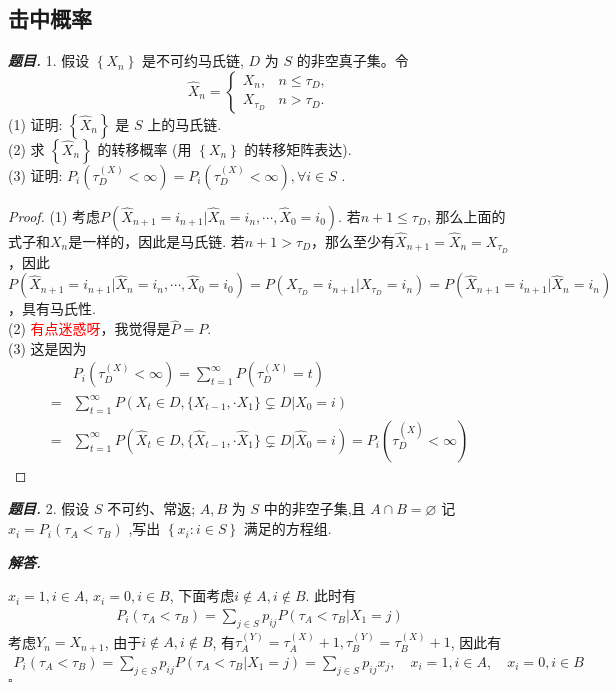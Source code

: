 \documentclass[10pt, a4paper, oneside]{ctexart}
\newenvironment{problem}{\begin{framed}\par\noindent\textbf{\textit{题目. }}}{\end{framed}\par}
\newenvironment{solution}{%
  \par\noindent\textbf{\textit{解答. }}\ignorespaces
}{%
  \hfill\ensuremath{\square}\par %
}
\begin{document}
\subsection{击中概率}
\begin{problem}
    1. 假设 $\left\{X_n\right\}$ 是不可约马氏链, $D$ 为 $S$ 的非空真子集。令
    $$
    \hat{X}_n= \begin{cases}X_n, & n \leqslant \tau_D, \\ X_{\tau_D} & n>\tau_D .\end{cases}
    $$
    (1) 证明: $\left\{\hat{X}_n\right\}$ 是 $S$ 上的马氏链.\\
    (2) 求 $\left\{\hat{X}_n\right\}$ 的转移概率 (用 $\left\{X_n\right\}$ 的转移矩阵表达).\\
    (3) 证明: \( {P}_{i}\left( {{\tau }_{D}^{\left( X\right) } < \infty }\right)  = {P}_{i}\left( {{\tau }_{D}^{\left( X\right) } < \infty }\right) ,\forall i \in  S \) .
\end{problem}
\begin{proof}
    (1) 考虑$P(\hat{X}_{n+1}=i_{n+1}|\hat{X}_n=i_{n},\cdots,\hat{X}_0=i_0 )$. 若$n+1\leq \tau_D$, 那么上面的式子和$X_n$是一样的，因此是马氏链. 若$n+1>\tau_D$，那么至少有$\hat{X}_{n+1}=\hat{X}_n=X_{\tau_D}$，因此$P(\hat{X}_{n+1}=i_{n+1}|\hat{X}_n=i_{n},\cdots,\hat{X}_0=i_0 )=P(X_{\tau_D}=i_{n+1}|X_{\tau_D}=i_n)=P(\hat{X}_{n+1}=i_{n+1}|\hat{X}_n=i_{n})$，具有马氏性.\\
    (2) \textcolor{red}{有点迷惑呀}，我觉得是$\hat{P}=P$.\\
    (3) 这是因为 
    \begin{align*}
        &P_i(\tau_D^{(X)}<\infty)=\sum_{t=1}^{\infty}P(\tau_D^{(X)}=t)\\=&\sum_{t=1}^{\infty}P(X_t\in D, \{X_{t-1},\cdot X_{1} \}\subsetneq D|X_0=i)\\
        =&\sum_{t=1}^{\infty}P(\hat{X}_t\in D, \{\hat{X}_{t-1},\cdot \hat{X}_{1} \}\subsetneq D|\hat{X}_0=i)=P_i(\tau_D^{(\hat{X})}<\infty)
    \end{align*}
\end{proof}
\begin{problem}
    2. 假设 \( S \) 不可约、常返; \( A,B \) 为 \( S \) 中的非空子集,且 \( A \cap  B = \varnothing  \) 记 \( {x}_{i} = {P}_{i}\left( {{\tau }_{A} < {\tau }_{B}}\right)  \) ,写出 \( \left\{  {{x}_{i} : i \in  S}\right\}   \) 满足的方程组.
\end{problem}
\begin{solution}
    $x_i=1,i\in A$, $x_i=0,i\in B$, 下面考虑$i\notin A, i\notin B$. 此时有
    \begin{align*}
        P_i(\tau_A<\tau_B)=\sum_{j\in S}p_{ij}P(\tau_A<\tau_B|X_1=j)
    \end{align*}
    考虑$Y_n=X_{n+1}$, 由于$i\notin A, i\notin B$, 有$\tau_A^{(Y)}=\tau_A^{(X)}+1, \tau_B^{(Y)}=\tau_B^{(X)}+1$, 因此有
    \begin{align*}
        P_i(\tau_A<\tau_B)=\sum_{j\in S}p_{ij}P(\tau_A<\tau_B|X_1=j)=\sum_{j\in S}p_{ij}x_j,\quad x_i=1,i\in A,\quad x_i=0,i\in B
    \end{align*}
\end{solution}
\end{document}
